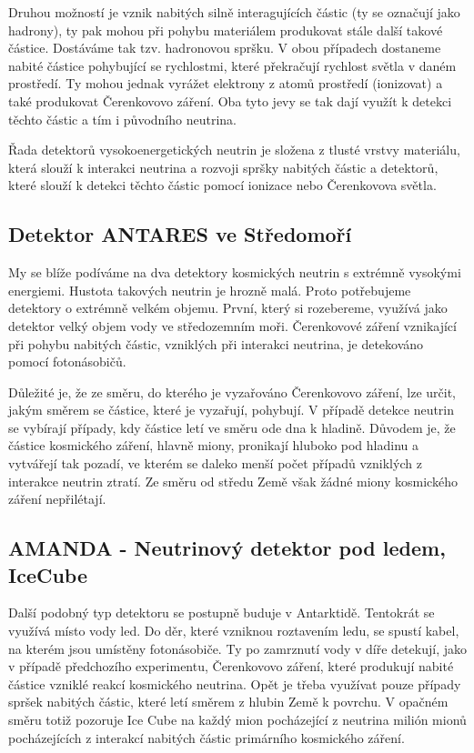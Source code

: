 \documentclass[../../main.tex]{subfiles}
\begin{document}
Druhou možností je vznik nabitých silně interagujících částic (ty se označují jako hadrony), ty pak mohou při pohybu materiálem produkovat stále další takové částice. Dostáváme tak tzv. hadronovou spršku. V obou případech dostaneme nabité částice pohybující se rychlostmi, které překračují rychlost světla v daném prostředí. Ty mohou jednak vyrážet elektrony z atomů prostředí (ionizovat) a také produkovat Čerenkovovo záření. Oba tyto jevy se tak dají využít k detekci těchto částic a tím i původního neutrina.

Řada detektorů vysokoenergetických neutrin je složena z tlusté vrstvy materiálu, která slouží k interakci neutrina a rozvoji spršky nabitých částic a detektorů, které slouží k detekci těchto částic pomocí ionizace nebo Čerenkovova světla.

\subsection{Detektor ANTARES ve Středomoří}

My se blíže podíváme na dva detektory kosmických neutrin s extrémně vysokými energiemi. Hustota takových neutrin je hrozně malá. Proto potřebujeme detektory o extrémně velkém objemu. První, který si rozebereme, využívá jako detektor velký objem vody ve středozemním moři. Čerenkovové záření vznikající při pohybu nabitých částic, vzniklých při interakci neutrina, je detekováno pomocí fotonásobičů. 

Důležité je, že ze směru, do kterého je vyzařováno Čerenkovovo záření, lze určit, jakým směrem se částice, které je vyzařují, pohybují. V případě detekce neutrin se vybírají případy, kdy částice letí ve směru ode dna k hladině. Důvodem je, že částice kosmického záření, hlavně miony, pronikají hluboko pod hladinu a vytvářejí tak pozadí, ve kterém se daleko menší počet případů vzniklých z interakce neutrin ztratí. Ze směru od středu Země však žádné miony kosmického záření nepřilétají.

\subsection{AMANDA - Neutrinový detektor pod ledem, IceCube}

Další podobný typ detektoru se postupně buduje v Antarktidě. Tentokrát se využívá místo vody led. Do děr, které vzniknou roztavením ledu, se spustí kabel, na kterém jsou umístěny fotonásobiče. Ty po zamrznutí vody v díře detekují, jako v případě předchozího experimentu, Čerenkovovo záření, které produkují nabité částice vzniklé reakcí kosmického neutrina. Opět je třeba využívat pouze případy spršek nabitých částic, které letí směrem z hlubin Země k povrchu. V opačném směru totiž pozoruje Ice Cube na každý mion pocházející z neutrina milión mionů pocházejících z interakcí nabitých částic primárního kosmického záření. 
\end{document}
